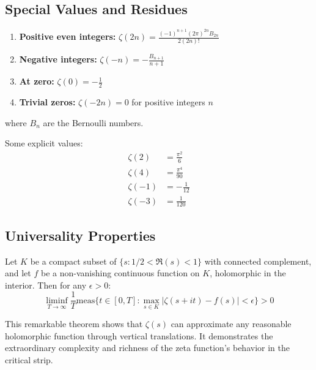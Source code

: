 \subsection{Special Values and Residues}

\begin{theorem}
\label{thm:integer_values}
\begin{enumerate}[label=(\alph*)]
\item \textbf{Positive even integers:} $\zeta(2n) = \frac{(-1)^{n+1}(2\pi)^{2n}B_{2n}}{2(2n)!}$
\item \textbf{Negative integers:} $\zeta(-n) = -\frac{B_{n+1}}{n+1}$
\item \textbf{At zero:} $\zeta(0) = -\frac{1}{2}$
\item \textbf{Trivial zeros:} $\zeta(-2n) = 0$ for positive integers $n$
\end{enumerate}
where $B_n$ are the Bernoulli numbers.
\end{theorem}

\begin{example}
Some explicit values:
\begin{align}
\zeta(2) &= \frac{\pi^2}{6} \\
\zeta(4) &= \frac{\pi^4}{90} \\
\zeta(-1) &= -\frac{1}{12} \\
\zeta(-3) &= \frac{1}{120}
\end{align}
\end{example}

\subsection{Universality Properties}

\begin{theorem}
\label{thm:voronin_universality}
Let $K$ be a compact subset of $\{s : 1/2 < \Re(s) < 1\}$ with connected complement, and let $f$ be a non-vanishing continuous function on $K$, holomorphic in the interior. Then for any $\epsilon > 0$:
\begin{equation}
\liminf_{T \to \infty} \frac{1}{T} \text{meas}\{t \in [0,T] : \max_{s \in K}|\zeta(s+it) - f(s)| < \epsilon\} > 0
\end{equation}
\end{theorem}

\begin{remark}
This remarkable theorem shows that $\zeta(s)$ can approximate any reasonable holomorphic function through vertical translations. It demonstrates the extraordinary complexity and richness of the zeta function's behavior in the critical strip.
\end{remark}

